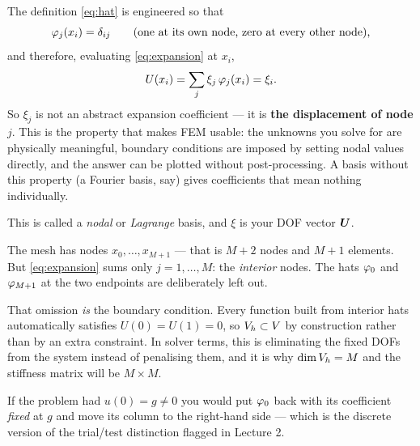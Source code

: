 \begin{center}
\end{center}

\begin{intuition}
The definition \eqref{eq:hat} is engineered so that
\[
  \varphi_{j}(x_{i}) = \delta_{ij}
  \qquad\text{(one at its own node, zero at every other node),}
\]
and therefore, evaluating \eqref{eq:expansion} at $x_{i}$,
\[
  U(x_{i}) = \sum_{j} \xi_{j}\,\varphi_{j}(x_{i}) = \xi_{i}.
\]
So $\xi_{j}$ is not an abstract expansion coefficient --- it is
\textbf{the displacement of node $j$}. This is the property that makes FEM
usable: the unknowns you solve for are physically meaningful, boundary
conditions are imposed by setting nodal values directly, and the answer can be
plotted without post-processing. A basis without this property (a Fourier
basis, say) gives coefficients that mean nothing individually.

This is called a \emph{nodal} or \emph{Lagrange} basis, and $\xi$ is your
DOF vector $\bm{U}$.
\end{intuition}

\begin{pitfall}[why the sum starts at $j=1$ and stops at $M$]
The mesh has nodes $x_{0},\dots,x_{M+1}$ --- that is $M+2$ nodes and $M+1$
elements. But \eqref{eq:expansion} sums only $j=1,\dots,M$: the
\emph{interior} nodes. The hats $\varphi_{0}$ and $\varphi_{M+1}$ at the two
endpoints are deliberately left out.

That omission \emph{is} the boundary condition. Every function built from
interior hats automatically satisfies $U(0)=U(1)=0$, so $V_{h}\subset V$ by
construction rather than by an extra constraint. In solver terms, this is
eliminating the fixed DOFs from the system instead of penalising them, and it
is why $\dim V_{h} = M$ and the stiffness matrix will be $M\times M$.

If the problem had $u(0)=g\ne0$ you would put $\varphi_{0}$ back with its
coefficient \emph{fixed} at $g$ and move its column to the right-hand side ---
which is the discrete version of the trial/test distinction flagged in
Lecture 2.
\end{pitfall}

